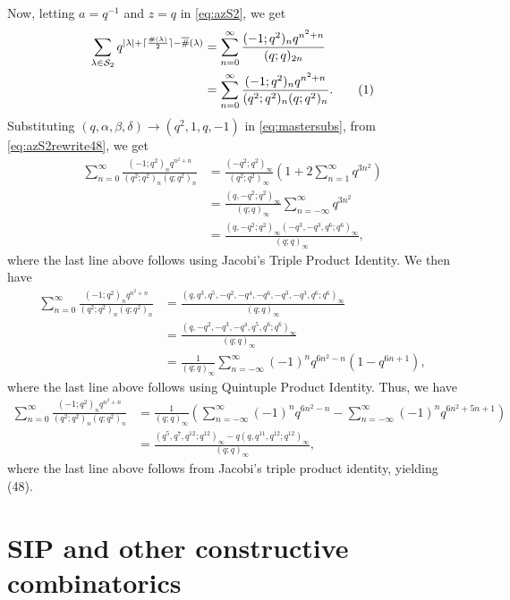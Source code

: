 \documentclass[11pt]{amsart}
\theoremstyle{definition}
\theoremstyle{remark}
\numberwithin{equation}{section}
\newcommand\numberthis{\addtocounter{equation}{1}\tag{\theequation}}
\begin{document}
Now, letting $a = q^{-1}$ and $z = q$ in \eqref{eq:azS2}, we get
\begin{align*}
\sum\limits_{\lambda\in\mathcal{S}_2}q^{|\lambda|+\lceil\frac{\#(\lambda)}{2}\rceil-\overline{\#}(\lambda)} &= \sum\limits_{n=0}^{\infty}\frac{(-1;q^2)_nq^{n^2+n}}{(q;q)_{2n}}\\
&= \sum\limits_{n=0}^{\infty}\frac{(-1;q^2)_nq^{n^2+n}}{(q^2;q^2)_{n}(q;q^2)_{n}}.\numberthis\label{eq:azS2rewrite48}
\end{align*}
Substituting $(q,\alpha,\beta,\delta)\rightarrow (q^2,1,q,-1)$ in \eqref{eq:mastersubs}, from \eqref{eq:azS2rewrite48}, we get
\begin{align*}
\sum\limits_{n=0}^{\infty}\frac{(-1;q^2)_nq^{n^2+n}}{(q^2;q^2)_{n}(q;q^2)_{n}} &= \frac{(-q^2;q^2)_{\infty}}{(q^2;q^2)_{\infty}}\left(1+2\sum\limits_{n=1}^{\infty}q^{3n^2}\right)\\
&= \frac{(q,-q^2;q^2)_{\infty}}{(q;q)_{\infty}}\sum\limits_{n=-\infty}^{\infty}q^{3n^2}\\
&= \frac{(q,-q^2;q^2)_{\infty}(-q^3,-q^3,q^6;q^6)_{\infty}}{(q;q)_{\infty}},
\end{align*}
where the last line above follows using Jacobi's Triple Product Identity. We then have
\begin{align*}
\sum\limits_{n=0}^{\infty}\frac{(-1;q^2)_nq^{n^2+n}}{(q^2;q^2)_{n}(q;q^2)_{n}} &= \frac{(q,q^3,q^5,-q^2,-q^4,-q^6,-q^3,-q^3,q^6;q^6)_{\infty}}{(q;q)_{\infty}}\\
&= \frac{(q,-q^2,-q^3,-q^4,q^5,q^6;q^6)_{\infty}}{(q;q)_{\infty}}\\
&= \frac{1}{(q;q)_{\infty}}\sum\limits_{n=-\infty}^{\infty}(-1)^nq^{6n^2-n}(1-q^{6n+1}),
\end{align*}
where the last line above follows using Quintuple Product Identity. Thus, we have
\begin{align*}
\sum\limits_{n=0}^{\infty}\frac{(-1;q^2)_nq^{n^2+n}}{(q^2;q^2)_{n}(q;q^2)_{n}} &= \frac{1}{(q;q)_{\infty}}\left(\sum\limits_{n=-\infty}^{\infty}(-1)^nq^{6n^2-n} - \sum\limits_{n=-\infty}^{\infty}(-1)^nq^{6n^2+5n+1}\right)\\
&= \frac{(q^5,q^7,q^{12};q^{12})_{\infty}-q(q,q^{11},q^{12};q^{12})_{\infty}}{(q;q)_{\infty}},
\end{align*}
where the last line above follows from Jacobi's triple product identity, yielding (48).

\section{SIP and other constructive combinatorics}
\label{sec:applications}
\end{document}
